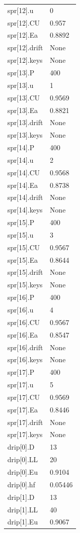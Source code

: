 {\begin{longtable}{p{}p{}}
{}spr[12].u & 0\\
{}spr[12].CU & 0.957\\
{}spr[12].Ea & 0.8892\\
{}spr[12].drift & None\\
{}spr[12].keys & None\\
{}spr[13].P & 400\\
{}spr[13].u & 1\\
{}spr[13].CU & 0.9569\\
{}spr[13].Ea & 0.8821\\
{}spr[13].drift & None\\
{}spr[13].keys & None\\
{}spr[14].P & 400\\
{}spr[14].u & 2\\
{}spr[14].CU & 0.9568\\
{}spr[14].Ea & 0.8738\\
{}spr[14].drift & None\\
{}spr[14].keys & None\\
{}spr[15].P & 400\\
{}spr[15].u & 3\\
{}spr[15].CU & 0.9567\\
{}spr[15].Ea & 0.8644\\
{}spr[15].drift & None\\
{}spr[15].keys & None\\
{}spr[16].P & 400\\
{}spr[16].u & 4\\
{}spr[16].CU & 0.9567\\
{}spr[16].Ea & 0.8547\\
{}spr[16].drift & None\\
{}spr[16].keys & None\\
{}spr[17].P & 400\\
{}spr[17].u & 5\\
{}spr[17].CU & 0.9569\\
{}spr[17].Ea & 0.8446\\
{}spr[17].drift & None\\
{}spr[17].keys & None\\
{}drip[0].D & 13\\
{}drip[0].LL & 20\\
{}drip[0].Eu & 0.9104\\
{}drip[0].hf & 0.05446\\
{}drip[1].D & 13\\
{}drip[1].LL & 40\\
{}drip[1].Eu & 0.9067\\

\end{longtable}}
